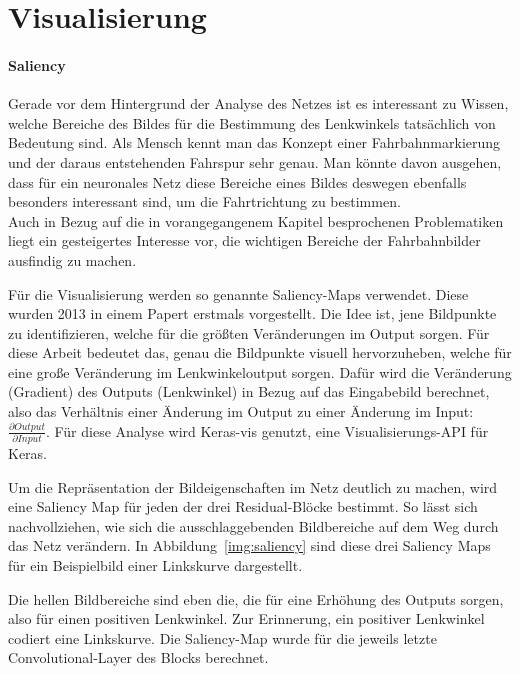 \section{Visualisierung}
\paragraph{Saliency}
Gerade vor dem Hintergrund der Analyse des Netzes  ist es interessant zu Wissen, welche Bereiche des Bildes für die Bestimmung des Lenkwinkels tatsächlich von Bedeutung sind. Als Mensch kennt man das Konzept einer Fahrbahnmarkierung und der daraus entstehenden Fahrspur sehr genau. Man könnte davon ausgehen, dass für ein neuronales Netz diese Bereiche eines Bildes deswegen ebenfalls besonders interessant sind, um die Fahrtrichtung zu bestimmen.\\
Auch in Bezug auf die in vorangegangenem Kapitel besprochenen Problematiken liegt ein gesteigertes Interesse vor, die wichtigen Bereiche der Fahrbahnbilder ausfindig zu machen.

Für die Visualisierung werden so genannte Saliency-Maps verwendet. Diese wurden 2013 in einem Papert \cite{simonyan2013deep} erstmals vorgestellt. Die Idee ist, jene Bildpunkte zu identifizieren, welche für die größten Veränderungen im Output sorgen. Für diese Arbeit bedeutet das, genau die Bildpunkte visuell hervorzuheben, welche für eine große Veränderung im Lenkwinkeloutput sorgen. Dafür wird die Veränderung (Gradient) des Outputs (Lenkwinkel) in Bezug auf das Eingabebild berechnet, also das Verhältnis einer Änderung im Output zu einer Änderung im Input: $\frac{\partial Output}{\partial Input}$.    Für diese Analyse wird Keras-vis  genutzt, eine Visualisierungs-API für Keras.

Um die Repräsentation der Bildeigenschaften im Netz deutlich zu machen, wird eine Saliency Map für jeden der drei Residual-Blöcke bestimmt. So lässt sich nachvollziehen, wie sich die ausschlaggebenden Bildbereiche auf dem Weg durch das Netz verändern. In Abbildung~\ref{img:saliency} sind diese drei Saliency Maps für ein Beispielbild einer Linkskurve dargestellt.

Die hellen Bildbereiche sind eben die, die für eine Erhöhung des Outputs sorgen, also für einen positiven Lenkwinkel. Zur Erinnerung, ein positiver Lenkwinkel codiert eine Linkskurve. Die Saliency-Map wurde für die jeweils letzte Convolutional-Layer des Blocks berechnet.


